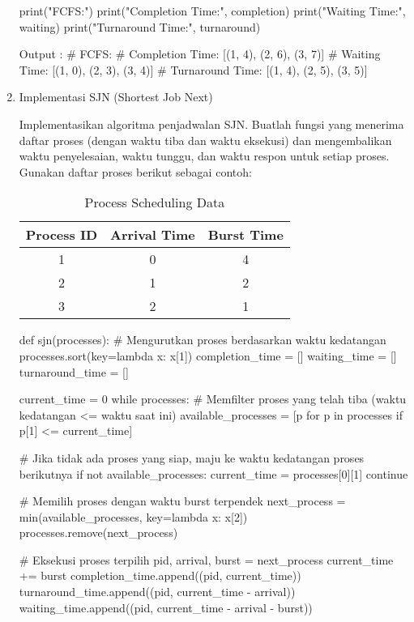 \documentclass[12pt]{article}
\begin{document}
\begin{enumerate}
\begin{python}
print("FCFS:")
print("Completion Time:", completion)
print("Waiting Time:", waiting)
print("Turnaround Time:", turnaround)

Output : 
# FCFS:
# Completion Time: [(1, 4), (2, 6), (3, 7)] 
# Waiting Time: [(1, 0), (2, 3), (3, 4)]
# Turnaround Time: [(1, 4), (2, 5), (3, 5)]
\end{python}
        
    \item Implementasi SJN (Shortest Job Next)
        \par  Implementasikan algoritma penjadwalan SJN. Buatlah fungsi yang menerima daftar proses (dengan waktu tiba dan waktu eksekusi) dan mengembalikan waktu penyelesaian, waktu tunggu, dan waktu respon untuk setiap proses. Gunakan daftar proses berikut sebagai contoh:
        \begin{table}[h!]
        \centering
        \begin{tabular}{|c|c|c|}
        \hline
        \textbf{Process ID} & \textbf{Arrival Time} & \textbf{Burst Time} \\ \hline
        1 & 0 & 4 \\ \hline
        2 & 1 & 2 \\ \hline
        3 & 2 & 1 \\ \hline
        \end{tabular}
        \caption{Process Scheduling Data}
        \end{table}
        
\begin{python}
def sjn(processes):
    # Mengurutkan proses berdasarkan waktu kedatangan
    processes.sort(key=lambda x: x[1]) 
    completion_time = []
    waiting_time = []
    turnaround_time = []
    
    current_time = 0
    while processes:
        # Memfilter proses yang telah tiba (waktu kedatangan <= waktu saat ini)
        available_processes = [p for p in processes if p[1] <= current_time]
        
        # Jika tidak ada proses yang siap, maju ke waktu kedatangan proses berikutnya
        if not available_processes:
            current_time = processes[0][1]
            continue
        
        # Memilih proses dengan waktu burst terpendek
        next_process = min(available_processes, key=lambda x: x[2])
        processes.remove(next_process)
        
        # Eksekusi proses terpilih
        pid, arrival, burst = next_process
        current_time += burst
        completion_time.append((pid, current_time))
        turnaround_time.append((pid, current_time - arrival))
        waiting_time.append((pid, current_time - arrival - burst))


\end{python}
\end{enumerate}
\end{document}
